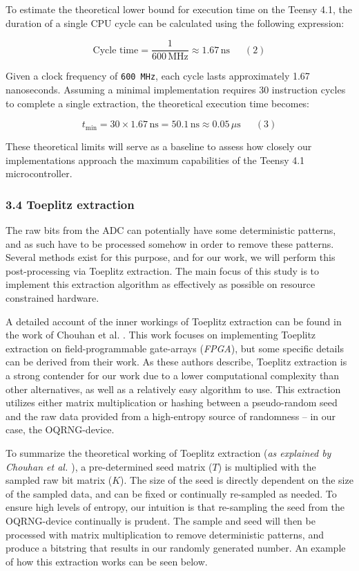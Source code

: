 To estimate the theoretical lower bound for execution time on the Teensy 4.1, the duration of a single CPU cycle can be calculated using the following expression:

\[
\text{Cycle time} = \frac{1}{600\, \mathrm{MHz}} \approx 1.67\, \mathrm{ns} \phantom{123}(2)
\]

Given a clock frequency of \texttt{600\ MHz}, each cycle lasts approximately 1.67 nanoseconds. Assuming a minimal implementation requires 30 instruction cycles to complete a single extraction, the theoretical execution time becomes:

\[
t_{\text{min}} = 30 \times 1.67\,\mathrm{ns} = 50.1\,\mathrm{ns} \approx 0.05\,\mu\mathrm{s} \phantom{123}(3)
\]

These theoretical limits will serve as a baseline to assess how closely our implementations approach the maximum capabilities of the Teensy 4.1 microcontroller.

\subsubsection{3.4 Toeplitz extraction}\label{toeplitz-extraction}

The raw bits from the ADC can potentially have some deterministic patterns, and as such have to be processed somehow in order to remove these patterns. Several methods exist for this purpose, and for our work, we will perform this post-processing via Toeplitz extraction. The main focus of this study is to implement this extraction algorithm as effectively as possible on resource constrained hardware.

A detailed account of the inner workings of Toeplitz extraction can be found in the work of Chouhan et al. \cite{toeplitz-desc}. This work focuses on implementing Toeplitz extraction on field-programmable gate-arrays (\emph{FPGA}), but some specific details can be derived from their work. As these authors describe, Toeplitz extraction is a strong contender for our work due to a lower computational complexity than other alternatives, as well as a relatively easy algorithm to use. This extraction utilizes either matrix multiplication or hashing between a pseudo-random seed and the raw data provided from a high-entropy source of randomness -- in our case, the OQRNG-device.

To summarize the theoretical working of Toeplitz extraction (\emph{as explained by Chouhan et al. \cite{toeplitz-desc}}), a pre-determined seed matrix (\(T\)) is multiplied with the sampled raw bit matrix (\(K\)). The size of the seed is directly dependent on the size of the sampled data, and can be fixed or continually re-sampled as needed. To ensure high levels of entropy, our intuition is that re-sampling the seed from the OQRNG-device continually is prudent. The sample and seed will then be processed with matrix multiplication to remove deterministic patterns, and produce a bitstring that results in our randomly generated number. An example of how this extraction works can be seen below.

